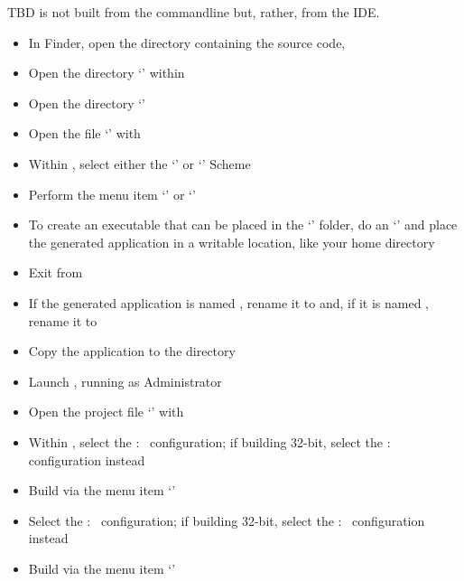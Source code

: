\tertiaryEnd
{}
TBD
\tertiaryEnd
\secondaryEnd
{}
\textit{\MMMU} is not built from the command\longDash{}line but, rather, from the IDE.
\begin{itemize}
\item In Finder, open the directory containing the \mplusm{} source code,
\item\exSp{}Open the directory `' within
\item\exSp{}Open the directory `'
\item\exSp{}Open the file `' with 
\item\exSp{}Within , select either the `' or
`' Scheme
\item\exSp{}Perform the menu item `' or
`'
\item\exSp{}To create an executable that can be placed in the `'
folder, do an `'
and place the generated application in a writable location, like your home directory
\item\exSp{}Exit from 
\item\exSp{}If the generated application is named , rename
it to  and, if it is named ,
rename it to 
\item\exSp{}Copy the  application to the 
directory
\end{itemize}
\tertiaryEnd
{}
\begin{itemize}
\item Launch , running as Administrator
\item\exSp{}Open the project file
`' with
\item\exSp{}Within , select the  :\ 
configuration; if building 32-bit, select the  :\ 
configuration instead
\item\exSp{}Build via the menu item `'
\item\exSp{}Select the  :\  configuration; if building 32-bit,
select the  :\  configuration instead
\item\exSp{}Build via the menu item `'
\end{itemize}
